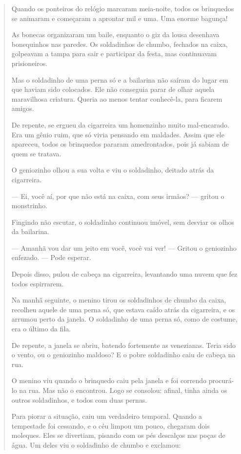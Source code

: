 \begin{escolha}
\begin{escolha}
\begin{escolha}
\begin{quote}
Quando os ponteiros do relógio marcaram meia-noite, todos os brinquedos
se animaram e começaram a aprontar mil e uma. Uma enorme bagunça!

As bonecas organizaram um baile, enquanto o giz da lousa desenhava
bonequinhos nas paredes. Os soldadinhos de chumbo, fechados na caixa,
golpeavam a tampa para sair e participar da festa, mas continuavam
prisioneiros.

Mas o soldadinho de uma perna só e a bailarina não saíram do lugar em
que haviam sido colocados. Ele não conseguia parar de olhar aquela
maravilhosa criatura. Queria ao menos tentar conhecê-la, para ficarem
amigos.

De repente, se ergueu da cigarreira um homenzinho muito mal-encarado.
Era um gênio ruim, que só vivia pensando em maldades. Assim que ele
apareceu, todos os brinquedos pararam amedrontados, pois já sabiam de
quem se tratava.

O geniozinho olhou a sua volta e viu o soldadinho, deitado atrás da
cigarreira.

--- Ei, você aí, por que não está na caixa, com seus irmãos? --- gritou
o monstrinho.

Fingindo não escutar, o soldadinho continuou imóvel, sem desviar os
olhos da bailarina.

--- Amanhã vou dar um jeito em você, você vai ver! --- Gritou o geniozinho
enfezado. --- Pode esperar.

Depois disso, pulou de cabeça na cigarreira, levantando uma nuvem que
fez todos espirrarem.

Na manhã seguinte, o menino tirou os soldadinhos de chumbo da caixa,
recolheu aquele de uma perna só, que estava caído atrás da cigarreira, e
os arrumou perto da janela. O soldadinho de uma perna só, como de
costume, era o último da fila.

De repente, a janela se abriu, batendo fortemente as venezianas. Teria
sido o vento, ou o geniozinho maldoso? E o pobre soldadinho caiu de
cabeça na rua.

O menino viu quando o brinquedo caiu pela janela e foi correndo
procurá-lo na rua. Mas não o encontrou. Logo se consolou: afinal, tinha
ainda os outros soldadinhos, e todos com duas pernas.

Para piorar a situação, caiu um verdadeiro temporal. Quando a tempestade
foi cessando, e o céu limpou um pouco, chegaram dois moleques. Eles se
divertiam, pisando com os pés descalços nas poças de água. Um deles viu
o soldadinho de chumbo e exclamou:


\end{quote}
\end{escolha}
\end{escolha}
\end{escolha}
